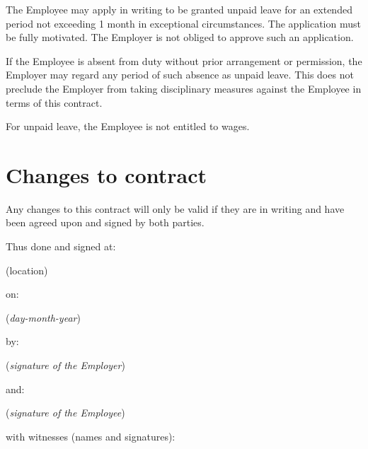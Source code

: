 \documentclass[a4paper,11pt]{article}
\begin{document}
\para The Employee may apply in writing to be granted unpaid leave for an
extended period not exceeding 1 month in exceptional circumstances. The
application must be fully motivated. The Employer is not obliged to approve
such an application.

\para If the Employee is absent from duty without prior arrangement or
permission, the Employer may regard any period of such absence as unpaid leave.
This does not preclude the Employer from taking disciplinary measures against
the Employee in terms of this contract.

\para For unpaid leave, the Employee is not entitled to wages.

\section{Changes to contract}
\label{changes}

\para Any changes to this contract will only be valid if they are in writing
and have been agreed upon and signed by both parties.

\pagebreak %

\rfoot{}

\begin{center}
  Thus done and signed at:

  \vspace{0.5cm}


  (location)

  \vspace{0.5cm}

  on:

  \vspace{0.5cm}


  (\textit{day-month-year})

  \vspace{0.5cm}

  by:

  \vspace{0.5cm}


  (\textit{signature of the Employer})

  \vspace{0.5cm}

  and:

  \vspace{0.5cm}


  (\textit{signature of the Employee})

  \vspace{0.5cm}

  with witnesses (names and signatures):

  \vspace{0.5cm}


  \vspace{0.5cm}


\end{center}
\end{document}
